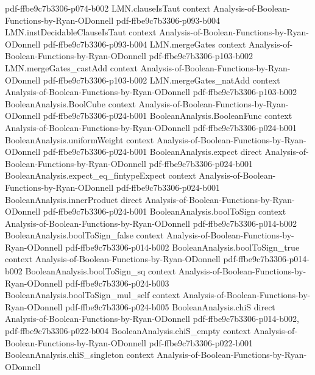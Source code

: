 \begin{lemma}
  {pdf-ffbe9c7b3306-p074-b002}
\proofstep
  {LMN.clauseIsTaut}
  {context}
  {Analysis-of-Boolean-Functions-by-Ryan-ODonnell}
  {pdf-ffbe9c7b3306-p093-b004}
\proofstep
  {LMN.instDecidableClauseIsTaut}
  {context}
  {Analysis-of-Boolean-Functions-by-Ryan-ODonnell}
  {pdf-ffbe9c7b3306-p093-b004}
\proofstep
  {LMN.mergeGates}
  {context}
  {Analysis-of-Boolean-Functions-by-Ryan-ODonnell}
  {pdf-ffbe9c7b3306-p103-b002}
\proofstep
  {LMN.mergeGates_castAdd}
  {context}
  {Analysis-of-Boolean-Functions-by-Ryan-ODonnell}
  {pdf-ffbe9c7b3306-p103-b002}
\proofstep
  {LMN.mergeGates_natAdd}
  {context}
  {Analysis-of-Boolean-Functions-by-Ryan-ODonnell}
  {pdf-ffbe9c7b3306-p103-b002}
\proofstep
  {BooleanAnalysis.BoolCube}
  {context}
  {Analysis-of-Boolean-Functions-by-Ryan-ODonnell}
  {pdf-ffbe9c7b3306-p024-b001}
\proofstep
  {BooleanAnalysis.BooleanFunc}
  {context}
  {Analysis-of-Boolean-Functions-by-Ryan-ODonnell}
  {pdf-ffbe9c7b3306-p024-b001}
\proofstep
  {BooleanAnalysis.uniformWeight}
  {context}
  {Analysis-of-Boolean-Functions-by-Ryan-ODonnell}
  {pdf-ffbe9c7b3306-p024-b001}
\proofstep
  {BooleanAnalysis.expect}
  {direct}
  {Analysis-of-Boolean-Functions-by-Ryan-ODonnell}
  {pdf-ffbe9c7b3306-p024-b001}
\proofstep
  {BooleanAnalysis.expect_eq_fintypeExpect}
  {context}
  {Analysis-of-Boolean-Functions-by-Ryan-ODonnell}
  {pdf-ffbe9c7b3306-p024-b001}
\proofstep
  {BooleanAnalysis.innerProduct}
  {direct}
  {Analysis-of-Boolean-Functions-by-Ryan-ODonnell}
  {pdf-ffbe9c7b3306-p024-b001}
\proofstep
  {BooleanAnalysis.boolToSign}
  {context}
  {Analysis-of-Boolean-Functions-by-Ryan-ODonnell}
  {pdf-ffbe9c7b3306-p014-b002}
\proofstep
  {BooleanAnalysis.boolToSign_false}
  {context}
  {Analysis-of-Boolean-Functions-by-Ryan-ODonnell}
  {pdf-ffbe9c7b3306-p014-b002}
\proofstep
  {BooleanAnalysis.boolToSign_true}
  {context}
  {Analysis-of-Boolean-Functions-by-Ryan-ODonnell}
  {pdf-ffbe9c7b3306-p014-b002}
\proofstep
  {BooleanAnalysis.boolToSign_sq}
  {context}
  {Analysis-of-Boolean-Functions-by-Ryan-ODonnell}
  {pdf-ffbe9c7b3306-p024-b003}
\proofstep
  {BooleanAnalysis.boolToSign_mul_self}
  {context}
  {Analysis-of-Boolean-Functions-by-Ryan-ODonnell}
  {pdf-ffbe9c7b3306-p024-b005}
\proofstep
  {BooleanAnalysis.chiS}
  {direct}
  {Analysis-of-Boolean-Functions-by-Ryan-ODonnell}
  {pdf-ffbe9c7b3306-p014-b002,
    pdf-ffbe9c7b3306-p022-b004}
\proofstep
  {BooleanAnalysis.chiS_empty}
  {context}
  {Analysis-of-Boolean-Functions-by-Ryan-ODonnell}
  {pdf-ffbe9c7b3306-p022-b001}
\proofstep
  {BooleanAnalysis.chiS_singleton}
  {context}
  {Analysis-of-Boolean-Functions-by-Ryan-ODonnell}

\end{lemma}
